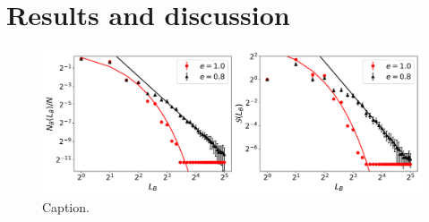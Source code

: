 \section{Results and discussion}


\begin{figure}[!h]
	\begin{center}
	\includegraphics[scale=0.47]{./images/task_6/N_B_and_S_vs_L_B.png} 
	\end{center}
	\caption{Caption.\\} 
	\label{fig:N_B_and_S_vs_L_B} 
\end{figure}



\lipsum[2-4]


\newpage